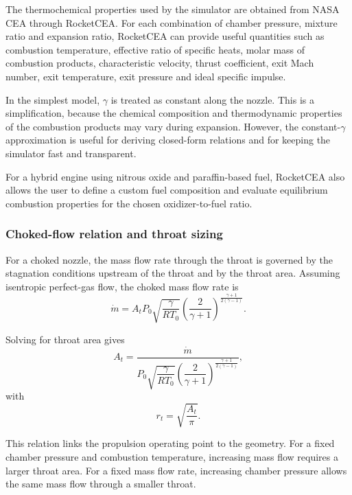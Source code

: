 \documentclass[journal,article,submit,oneauthor]{Definitions/mdpi}
\begin{document}
The thermochemical properties used by the simulator are obtained from NASA CEA through RocketCEA. For each combination of chamber pressure, mixture ratio and expansion ratio, RocketCEA can provide useful quantities such as combustion temperature, effective ratio of specific heats, molar mass of combustion products, characteristic velocity, thrust coefficient, exit Mach number, exit temperature, exit pressure and ideal specific impulse.

In the simplest model, $\gamma$ is treated as constant along the nozzle. This is a simplification, because the chemical composition and thermodynamic properties of the combustion products may vary during expansion. However, the constant-$\gamma$ approximation is useful for deriving closed-form relations and for keeping the simulator fast and transparent.

For a hybrid engine using nitrous oxide and paraffin-based fuel, RocketCEA also allows the user to define a custom fuel composition and evaluate equilibrium combustion properties for the chosen oxidizer-to-fuel ratio.

\subsubsection{Choked-flow relation and throat sizing}

For a choked nozzle, the mass flow rate through the throat is governed by the stagnation conditions upstream of the throat and by the throat area. Assuming isentropic perfect-gas flow, the choked mass flow rate is
\begin{equation}
\dot{m}=A_t P_0
\sqrt{\frac{\gamma}{R T_0}}
\left(\frac{2}{\gamma+1}\right)^\frac{\gamma+1}{2(\gamma-1)} .
\label{eq:choked_mdot}
\end{equation}

Solving for throat area gives
\begin{equation}
A_t =
\frac{\dot{m}}{P_0
\sqrt{\dfrac{\gamma}{R T_0}}
\left(\dfrac{2}{\gamma+1}\right)^\frac{\gamma+1}{2(\gamma-1)}} ,
\label{eq:throat_area}
\end{equation}
with
\begin{equation}
r_t=\sqrt{\frac{A_t}{\pi}} .
\label{eq:throat_radius}
\end{equation}

This relation links the propulsion operating point to the geometry. For a fixed chamber pressure and combustion temperature, increasing mass flow requires a larger throat area. For a fixed mass flow rate, increasing chamber pressure allows the same mass flow through a smaller throat.
\end{document}
